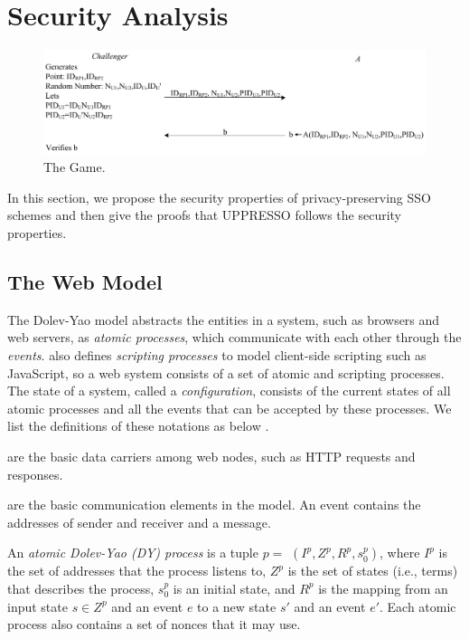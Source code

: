 \section{Security Analysis}
\label{sec:analysis}
\begin{figure}
  \centering
  \includegraphics[width=0.82\linewidth]{fig/game1.pdf}
  \vspace{-6mm}
  \caption{The Game.}
  \label{fig:game}
\vspace{-7mm}
\end{figure}
In this section, we propose the security properties of privacy-preserving SSO schemes and then give the proofs that UPPRESSO follows the security properties.
\subsection{The Web Model}
\label{subsec:webmodel}
The Dolev-Yao model abstracts the entities in a system, such as browsers and web servers, as {\em atomic processes}, which communicate with each other through the {\em events}. \cite{SPRESSO} also defines {\em scripting processes} to model client-side scripting such as JavaScript, so a web system consists of a set of atomic and scripting processes. The state of a system, called a {\em configuration}, consists of the current states of all atomic processes and all the events that can be accepted by these processes. We list the definitions of these notations as below \cite{SPRESSO}.

  are the basic data carriers among web nodes, such as HTTP requests and responses.

 are the basic communication elements in the model. An event contains the addresses of sender and receiver and a message.

 An {\em atomic Dolev-Yao (DY) process} is a tuple $p=$ $(I^p, Z^p, R^p,s_0^p )$, where $I^p$ is the set of addresses that the process listens to, $Z^p$ is the set of states (i.e., terms) that describes the process, $s_0^p$ is an initial state, and $R^p$ is the mapping from an input state $s \in Z^p$ and an event $e$ to a new state $s'$ and an event $e'$. %
Each atomic process also contains a set of nonces that it may use.

